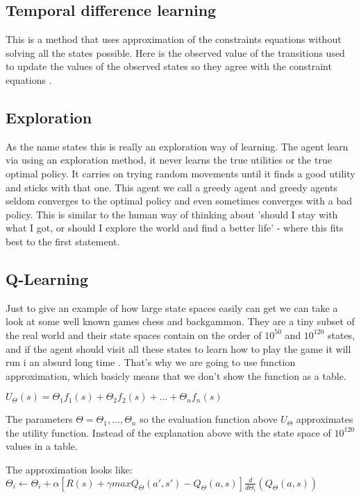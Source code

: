\subsection*{Temporal difference learning}
This is a method that uses approximation of the constraints equations without solving all the states possible. Here is the observed value of the transitions used to update the values of the observed states so they agree with the constraint equations \cite[p. 767]{rl}. 

\subsection*{Exploration}
As the name states this is really an exploration way of learning. The agent learn via using an exploration method, it never learns the true utilities or the true optimal policy. It carries on trying random movements until it finds a good utility and sticks with that one. This agent we call a greedy agent and greedy agents seldom converges to the optimal policy and even sometimes converges with a bad policy. This is similar to the human way of thinking about 'should I stay with what I got, or should I explore the world and find a better life' - where this fits best to the first statement. \cite[p. 771]{rl}

\subsection{Q-Learning}			
Just to give an example of how large state spaces easily can get we can take a look at some well known games chess and backgammon. They are a tiny subset of the real world and their state spaces contain on the order of $10^50$ and $10^120$ states, and if the agent should visit all these states to learn how to play the game it will run i an absurd long time \cite[p. 777]{rl}. That's why we are going to use function approximation, which basicly means that we don't show the function as a table.

$U_\Theta(s) = \Theta_1 f_1(s) + \Theta_2 f_2(s) + ... + \Theta_n f_n(s) $

The parameters $\Theta = \Theta_1, ..., \Theta_n$ so the evaluation function above $U_\Theta$ approximates the utility function. Instead of the explanation above with the state space of $10^120$ values in a table.

The approximation looks like:
$\Theta_i \leftarrow \Theta_i + \alpha [ R(s) + \gamma maxQ_\Theta(a',s')-Q_\Theta(a,s) ] \frac{d}{d\Theta_i}(Q_\Theta(a,s))$


